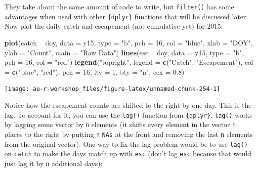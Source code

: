 \documentclass[]{book}
\newenvironment{Shaded}{\begin{snugshade}}{\end{snugshade}}
\newcommand{\DataTypeTok}[1]{\textcolor[rgb]{0.13,0.29,0.53}{#1}}
\newcommand{\DecValTok}[1]{\textcolor[rgb]{0.00,0.00,0.81}{#1}}
\newcommand{\FloatTok}[1]{\textcolor[rgb]{0.00,0.00,0.81}{#1}}
\newcommand{\KeywordTok}[1]{\textcolor[rgb]{0.13,0.29,0.53}{\textbf{#1}}}
\newcommand{\NormalTok}[1]{#1}
\newcommand{\OperatorTok}[1]{\textcolor[rgb]{0.81,0.36,0.00}{\textbf{#1}}}
\newcommand{\StringTok}[1]{\textcolor[rgb]{0.31,0.60,0.02}{#1}}
\begin{document}
They take about the same amount of code to write, but \texttt{filter()} has some advantages when used with other \texttt{\{dplyr\}} functions that will be discussed later. Now plot the daily catch and escapement (not cumulative yet) for 2015:

\begin{Shaded}
\begin{Highlighting}[]
\KeywordTok{plot}\NormalTok{(catch }\OperatorTok{~}\StringTok{ }\NormalTok{doy, }\DataTypeTok{data =}\NormalTok{ y15, }\DataTypeTok{type =} \StringTok{"b"}\NormalTok{, }\DataTypeTok{pch =} \DecValTok{16}\NormalTok{, }\DataTypeTok{col =} \StringTok{"blue"}\NormalTok{,}
     \DataTypeTok{xlab =} \StringTok{"DOY"}\NormalTok{, }\DataTypeTok{ylab =} \StringTok{"Count"}\NormalTok{, }\DataTypeTok{main =} \StringTok{"Raw Data"}\NormalTok{)}
\KeywordTok{lines}\NormalTok{(esc }\OperatorTok{~}\StringTok{ }\NormalTok{doy, }\DataTypeTok{data =}\NormalTok{ y15, }\DataTypeTok{type =} \StringTok{"b"}\NormalTok{, }\DataTypeTok{pch =} \DecValTok{16}\NormalTok{, }\DataTypeTok{col =} \StringTok{"red"}\NormalTok{)}
\KeywordTok{legend}\NormalTok{(}\StringTok{"topright"}\NormalTok{, }\DataTypeTok{legend =} \KeywordTok{c}\NormalTok{(}\StringTok{"Catch"}\NormalTok{, }\StringTok{"Escapement"}\NormalTok{), }
       \DataTypeTok{col =} \KeywordTok{c}\NormalTok{(}\StringTok{"blue"}\NormalTok{, }\StringTok{"red"}\NormalTok{), }\DataTypeTok{pch =} \DecValTok{16}\NormalTok{, }\DataTypeTok{lty =} \DecValTok{1}\NormalTok{, }\DataTypeTok{bty =} \StringTok{"n"}\NormalTok{, }\DataTypeTok{cex =} \FloatTok{0.8}\NormalTok{)}
\end{Highlighting}
\end{Shaded}

\begin{center}\texttt{[image: au-r-workshop\_files/figure-latex/unnamed-chunk-254-1]} \end{center}

Notice how the escapement counts are shifted to the right by one day. This is the lag. To account for it, you can use the \texttt{lag()} function from \texttt{\{dplyr\}}. \texttt{lag()} works by lagging some vector by \texttt{n} elements (it shifts every element in the vector \texttt{n} places to the right by putting \texttt{n} \texttt{NAs} at the front and removing the last \texttt{n} elements from the original vector). One way to fix the lag problem would be to use \texttt{lag()} on \texttt{catch} to make the days match up with \texttt{esc} (don't lag \texttt{esc} because that would just lag it by \texttt{n} additional days):
\end{document}
